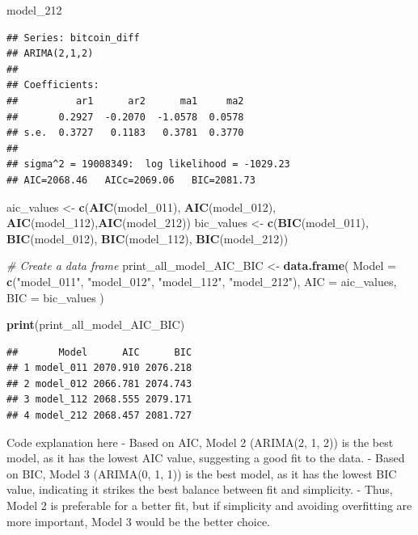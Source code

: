 \documentclass[
]{book}
\newenvironment{Shaded}{\begin{snugshade}}{\end{snugshade}}
\newcommand{\AttributeTok}[1]{\textcolor[rgb]{0.13,0.29,0.53}{#1}}
\newcommand{\CommentTok}[1]{\textcolor[rgb]{0.56,0.35,0.01}{\textit{#1}}}
\newcommand{\FunctionTok}[1]{\textcolor[rgb]{0.13,0.29,0.53}{\textbf{#1}}}
\newcommand{\NormalTok}[1]{#1}
\newcommand{\OtherTok}[1]{\textcolor[rgb]{0.56,0.35,0.01}{#1}}
\newcommand{\StringTok}[1]{\textcolor[rgb]{0.31,0.60,0.02}{#1}}
\begin{document}
\begin{Shaded}
\begin{Highlighting}[]
\NormalTok{model\_212}
\end{Highlighting}
\end{Shaded}

\begin{verbatim}
## Series: bitcoin_diff 
## ARIMA(2,1,2) 
## 
## Coefficients:
##          ar1      ar2      ma1     ma2
##       0.2927  -0.2070  -1.0578  0.0578
## s.e.  0.3727   0.1183   0.3781  0.3770
## 
## sigma^2 = 19008349:  log likelihood = -1029.23
## AIC=2068.46   AICc=2069.06   BIC=2081.73
\end{verbatim}

\begin{Shaded}
\begin{Highlighting}[]
\NormalTok{aic\_values }\OtherTok{\textless{}{-}} \FunctionTok{c}\NormalTok{(}\FunctionTok{AIC}\NormalTok{(model\_011), }\FunctionTok{AIC}\NormalTok{(model\_012), }\FunctionTok{AIC}\NormalTok{(model\_112),}\FunctionTok{AIC}\NormalTok{(model\_212))}
\NormalTok{bic\_values }\OtherTok{\textless{}{-}} \FunctionTok{c}\NormalTok{(}\FunctionTok{BIC}\NormalTok{(model\_011), }\FunctionTok{BIC}\NormalTok{(model\_012), }\FunctionTok{BIC}\NormalTok{(model\_112), }\FunctionTok{BIC}\NormalTok{(model\_212))}

\CommentTok{\# Create a data frame}
\NormalTok{print\_all\_model\_AIC\_BIC }\OtherTok{\textless{}{-}} \FunctionTok{data.frame}\NormalTok{(}
  \AttributeTok{Model =} \FunctionTok{c}\NormalTok{(}\StringTok{"model\_011"}\NormalTok{, }\StringTok{"model\_012"}\NormalTok{, }\StringTok{"model\_112"}\NormalTok{, }\StringTok{"model\_212"}\NormalTok{),}
  \AttributeTok{AIC =}\NormalTok{ aic\_values,}
  \AttributeTok{BIC =}\NormalTok{ bic\_values}
\NormalTok{)}

\FunctionTok{print}\NormalTok{(print\_all\_model\_AIC\_BIC)}
\end{Highlighting}
\end{Shaded}

\begin{verbatim}
##       Model      AIC      BIC
## 1 model_011 2070.910 2076.218
## 2 model_012 2066.781 2074.743
## 3 model_112 2068.555 2079.171
## 4 model_212 2068.457 2081.727
\end{verbatim}

Code explanation here
- Based on AIC, Model 2 (ARIMA(2, 1, 2)) is the best model, as it has the lowest AIC value, suggesting a good fit to the data.
- Based on BIC, Model 3 (ARIMA(0, 1, 1)) is the best model, as it has the lowest BIC value, indicating it strikes the best balance between fit and simplicity.
- Thus, Model 2 is preferable for a better fit, but if simplicity and avoiding overfitting are more important, Model 3 would be the better choice.
\end{document}
